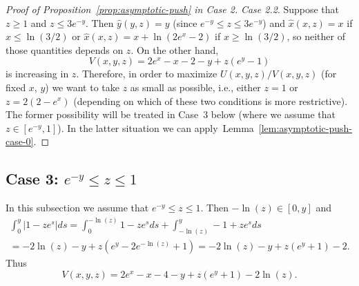 \documentclass[a4paper]{amsart} %
\theoremstyle{definition}
\theoremstyle{remark}
\numberwithin{equation}{section}
\newcommand*{\xGain}{\hat{x}}
\newcommand*{\yGain}{\hat{y}}
\newcommand*{\XXXasymptoticDenominator}{V}
\newcommand*{\XXXasymptoticNominator}{U}
\begin{document}
\begin{proof}[Proof of Proposition~\ref{prop:asymptotic-push} in Case 2]
	

	


\emph{Case 2.2}.
	Suppose that $z\geq 1$ and $z\leq 3e^{-y}$.
	Then $\yGain(y,z) = y$ (since $e^{-y} \leq z\leq 3e^{-y}$) 
	and $\xGain(x,z) = x$ if $x\leq \ln(3/2)$ 
	or $\xGain(x,z) = x + \ln(2e^x-2)$ if $x\geq \ln(3/2)$,
	so neither of those quantities depends on $z$. 
	On the other hand, 
	\begin{equation*}
	\XXXasymptoticDenominator(x,y,z) = 2e^x - x- 2 -y + z(e^y-1)
	\end{equation*}
	is increasing in $z$.
	Therefore, in order to maximize $\XXXasymptoticNominator(x,y,z)/\XXXasymptoticDenominator(x,y,z)$ (for fixed $x$, $y$)
	we want to take $z$ as small as possible, i.e.,
	either $z=1$ or $z=2(2-e^x)$
	(depending on which of these two conditions is more restrictive).	
	The former possibility will be treated in Case~3 below (where we assume that $z\in [e^{-y}, 1]$). 
	In the latter situation we can apply~Lemma~\ref{lem:asymptotic-push-case-0}.
	\end{proof}

\subsection{Case 3: \texorpdfstring{$e^{-y} \leq z \leq 1$}{exp(-y) leq z leq 1}}

In this subsection we assume that $e^{-y} \leq z \leq 1$.
Then $ -\ln(z) \in [0, y]$ 
and
\begin{multline*}
\int_0^y |1-z e^s| ds
= \int_0^{-\ln(z)} 1 - z e^s ds + \int_{-\ln(z)}^y  - 1 + z e^s ds\\
= -2\ln(z) - y + z(e^y - 2e^{-\ln(z)} + 1)
= -2\ln(z) - y + z (e^y + 1) -2.
\end{multline*}
Thus
\begin{equation*}
\XXXasymptoticDenominator(x,y,z)
 = 2e^x - x -4  
   - y + z (e^y + 1) -2\ln(z) .
\end{equation*}
\end{document}
